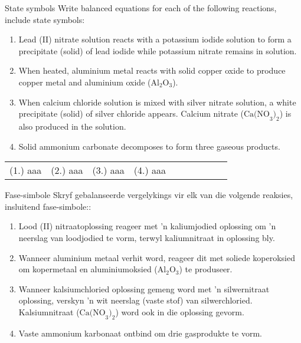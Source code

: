 \begin{exercises}{State symbols}
            \nopagebreak \vspace{-1cm}
      \label{m38727*id66790}Write balanced equations for each of the following reactions, include state symbols:\par 
      \label{m38727*id66796}\begin{enumerate}[noitemsep, label=\textbf{\arabic*}. ] 
        \label{m38727*uid33}\item Lead (II) nitrate solution reacts with a potassium iodide solution to form a precipitate (solid) of lead iodide while potassium nitrate remains in solution.
\label{m38727*uid34}\item When heated, aluminium metal reacts with solid copper oxide to produce copper metal and aluminium oxide (${\text{Al}}_{2}{\text{O}}_{3}$).
\label{m38727*uid35}\item When calcium chloride solution is mixed with silver nitrate solution, a white precipitate (solid) of silver chloride appears. Calcium nitrate ($\text{Ca(NO}_{3}\text{)}_{2}$) is also produced in the solution.
\item Solid ammonium carbonate decomposes to form three gaseous products.
        \end{enumerate}
\practiceinfo
 \begin{tabular}[h]{cccccc}
 (1.) aaa &  (2.) aaa &  (3.) aaa &  (4.) aaa &    &   &   &   &   &   & \end{tabular}
\end{exercises}
 \begin{activity}{Fase-simbole}
            \nopagebreak
Skryf gebalanseerde vergelykings vir elk van die volgende reaksies, insluitend fase-simbole::\par 
      \label{m38727*id66796}\begin{enumerate}[noitemsep, label=\textbf{\arabic*}. ] 
        \label{m38727*uid33}\item Lood (II) nitraatoplossing reageer met 'n kaliumjodied oplossing om  'n neerslag van loodjodied te vorm, terwyl kaliumnitraat in oplossing bly.
\label{m38727*uid34}\item Wanneer aluminium metaal verhit word, reageer dit met soliede koperoksied om kopermetaal en  aluminiumoksied (${\text{Al}}_{2}{\text{O}}_{3}$) te produseer.
\label{m38727*uid35}\item Wanneer kalsiumchloried oplossing gemeng word met  'n silwernitraat oplossing, verskyn 'n wit neerslag (vaste stof) van silwerchloried. Kalsiumnitraat ($\text{{Ca(NO}}_{3}\text{)}_{2}$) word ook in die oplossing gevorm.
\item Vaste ammonium karbonaat ontbind om drie gasprodukte te vorm.
        \end{enumerate}
\end{activity}
